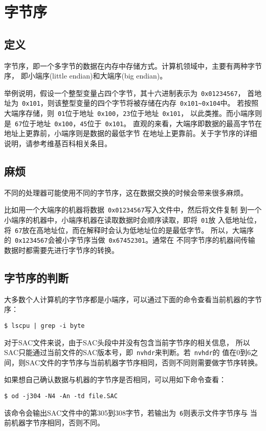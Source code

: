 \section{字节序}
\label{sec:endian}
\subsection{定义}
字节序，即一个多字节的数据在内存中存储方式。计算机领域中，主要有两种字节序，
即小端序(little endian)和大端序(big endian)。

举例说明，假设一个整型变量占四个字节，其十六进制表示为~\verb+0x01234567+，
首地址为~\verb+0x101+，则该整型变量的四个字节将被存储在内存~\verb+0x101~0x104+中。
若按照大端序存储，则~\verb+01+位于地址~\verb+0x100+，\verb+23+位于地址~\verb+0x101+，
以此类推。而小端序则是~\verb+67+位于地址~\verb+0x100+，\verb+45+位于~\verb+0x101+。
直观的来看，大端序即数据的最高字节在地址上更靠前，小端序则是数据的最低字节
在地址上更靠前。关于字节序的详细说明，请参考维基百科相关条目。

\subsection{麻烦}
不同的处理器可能使用不同的字节序，这在数据交换的时候会带来很多麻烦。

比如用一个大端序的机器将数据~\verb+0x01234567+写入文件中，然后将文件复制
到一个小端序的机器中，小端序机器在读取数据时会顺序读取，即将~\verb+01+放
入低地址位，将~\verb+67+放在高地址位，而在解释时会认为低地址位的是最低字节。
所以，大端序的~\verb+0x1234567+会被小字节序当做~\verb+0x67452301+。通常在
不同字节序的机器间传输数据时都需要先进行字节序的转换。

\subsection{字节序的判断}
大多数个人计算机的字节序都是小端序，可以通过下面的命令查看当前机器的字节序：
\begin{verbatim}
$ lscpu | grep -i byte
\end{verbatim}

对于SAC文件来说，由于SAC头段中并没有包含当前字节序的相关信息，
所以SAC只能通过当前文件的SAC版本号，即~\verb+nvhdr+来判断。若~\verb+nvhdr+的
值在0到6之间，则SAC文件的字节序与当前机器字节序相同，否则不同则需要做字节序转换。

如果想自己确认数据与机器的字节序是否相同，可以用如下命令查看：
\begin{verbatim}
$ od -j304 -N4 -An -td file.SAC
\end{verbatim}
该命令会输出SAC文件中的第305到308字节，若输出为~\verb+6+则表示文件字节序与
当前机器字节序相同，否则不同。

